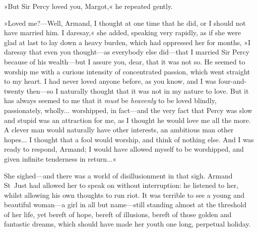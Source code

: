 »But Sir Percy loved you, Margot,« he repeated gently.

»Loved me?\allowbreak---\allowbreak Well, Armand, I thought at one time that he did, or I should not have married him. I daresay,« she added, speaking very rapidly, as if she were glad at last to lay down a heavy burden, which had oppressed her for months, »I daresay that even you thought\allowbreak---\allowbreak as everybody else did\allowbreak---\allowbreak that I married Sir Percy because of his wealth\allowbreak---\allowbreak but I assure you, dear, that it was not so. He seemed to worship me with a curious intensity of concentrated passion, which went straight to my heart. I had never loved anyone before, as you know, and I was four-and-twenty then\allowbreak---\allowbreak so I naturally thought that it was not in my nature to love. But it has always seemed to me that it \textit{must} be \textit{heavenly} to be loved blindly, passionately, wholly... worshipped, in fact\allowbreak---\allowbreak and the very fact that Percy was slow and stupid was an attraction for me, as I thought he would love me all the more. A clever man would naturally have other interests, an ambitious man other hopes... I thought that a fool would worship, and think of nothing else. And I was ready to respond, Armand; I would have allowed myself to be worshipped, and given infinite tenderness in return...«

She sighed\allowbreak---\allowbreak and there was a world of disillusionment in that sigh. Armand St~Just had allowed her to speak on without interruption: he listened to her, whilst allowing his own thoughts to run riot. It was terrible to see a young and beautiful woman\allowbreak---\allowbreak a girl in all but name\allowbreak---\allowbreak still standing almost at the threshold of her life, yet bereft of hope, bereft of illusions, bereft of those golden and fantastic dreams, which should have made her youth one long, perpetual holiday.

